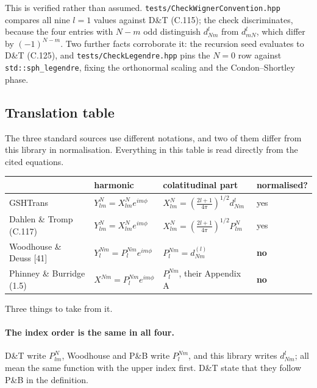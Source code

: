 \documentclass[11pt,a4paper]{article}
\newcommand{\code}[1]{\texttt{#1}}
\begin{document}
This is verified rather than assumed.  \code{tests/CheckWignerConvention.hpp}
compares all nine $l=1$ values against D\&T (C.115); the check
discriminates, because the four entries with $N-m$ odd distinguish
$d^l_{Nm}$ from $d^l_{mN}$, which differ by $(-1)^{N-m}$.  Two further
facts corroborate it: the recursion seed evaluates to D\&T (C.125), and
\code{tests/CheckLegendre.hpp} pins the $N=0$ row against
\code{std::sph\_legendre}, fixing the orthonormal scaling and the
Condon--Shortley phase.

\subsection{Translation table}

The three standard sources use different notations, and two of them differ
from this library in normalisation.  Everything in this table is read
directly from the cited equations.

\begin{center}
\begin{tabular}{llll}
  \toprule
  & harmonic & colatitudinal part & normalised? \\
  \midrule
  GSHTrans
    & $Y^{N}_{lm} = X^{N}_{lm} e^{im\phi}$
    & $X^{N}_{lm} = \left(\tfrac{2l+1}{4\pi}\right)^{1/2} d^{l}_{Nm}$
    & yes \\
  Dahlen \& Tromp (C.117)
    & $Y^{N}_{lm} = X^{N}_{lm} e^{im\phi}$
    & $X^{N}_{lm} = \left(\tfrac{2l+1}{4\pi}\right)^{1/2} P^{N}_{lm}$
    & yes \\
  Woodhouse \& Deuss [41]
    & $Y^{Nm}_{l} = P^{Nm}_{l} e^{im\phi}$
    & $P^{Nm}_{l} = d^{(l)}_{Nm}$
    & \textbf{no} \\
  Phinney \& Burridge (1.5)
    & $X^{Nm} = P^{Nm}_{l} e^{im\phi}$
    & $P^{Nm}_{l}$, their Appendix A
    & \textbf{no} \\
  \bottomrule
\end{tabular}
\end{center}

Three things to take from it.

\paragraph{The index order is the same in all four.}  D\&T write
$P^{N}_{lm}$, Woodhouse and P\&B write $P^{Nm}_{l}$, and this library
writes $d^{l}_{Nm}$; all mean the same function with the upper index
first.  D\&T state that they follow P\&B in the definition.
\end{document}
